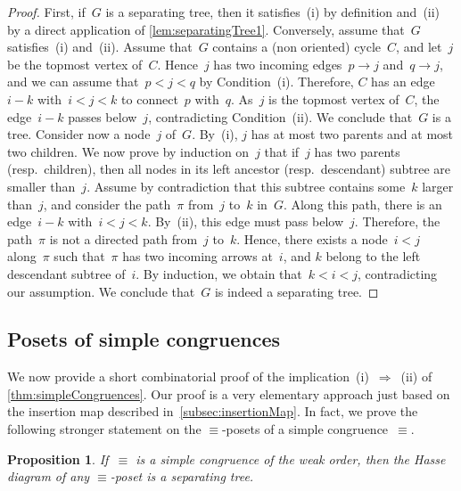 \documentclass{amsart}
\newtheorem{proposition}[theorem]{Proposition}
\theoremstyle{definition}
\begin{document}
\begin{proof}
First, if~$G$ is a separating tree, then it satisfies~(i) by definition and~(ii) by a direct application of \cref{lem:separatingTree1}.
Conversely, assume that~$G$ satisfies~(i) and~(ii).
Assume that~$G$ contains a (non oriented) cycle~$C$, and let~$j$ be the topmost vertex of~$C$.
Hence~$j$ has two incoming edges~$p \to j$ and~$q \to j$, and we can assume that~$p < j < q$ by Condition~(i).
Therefore, $C$ has an edge~$i-k$ with~$i < j < k$ to connect~$p$ with~$q$.
As~$j$ is the topmost vertex of~$C$, the edge~$i-k$ passes below~$j$, contradicting Condition~(ii).
We conclude that~$G$ is a tree.
Consider now a node~$j$ of~$G$.
By~(i), $j$ has at most two parents and at most two children.
We now prove by induction on~$j$ that if~$j$ has two parents (resp.~children), then all nodes in its left ancestor (resp.~descendant) subtree are smaller than~$j$.
Assume by contradiction that this subtree contains some~$k$ larger than~$j$, and consider the path~$\pi$ from~$j$ to~$k$ in~$G$.
Along this path, there is an edge~$i - k$ with~$i < j < k$.
By~(ii), this edge must pass below~$j$.
Therefore, the path~$\pi$ is not a directed path from~$j$ to~$k$.
Hence, there exists a node~$i < j$ along~$\pi$ such that~$\pi$ has two incoming arrows at~$i$, and $k$ belong to the left descendant subtree of~$i$.
By induction, we obtain that~$k < i < j$, contradicting our assumption.
We conclude that~$G$ is indeed a separating tree.
\end{proof}


\subsection{Posets of simple congruences}
\label{subsec:posetsSimpleCongruences}

We now provide a short combinatorial proof of the implication~(i)~$\Longrightarrow$~(ii) of \cref{thm:simpleCongruences}.
Our proof is a very elementary approach just based on the insertion map described in~\cref{subsec:insertionMap}.
In fact, we prove the following stronger statement on the $\equiv$-posets of a simple congruence~$\equiv$.

\begin{proposition}
\label{prop:simpleImpliesSeparatingTrees}
If~$\equiv$ is a simple congruence of the weak order, then the Hasse diagram of any $\equiv$-poset is a separating tree.
\end{proposition}
\end{document}
